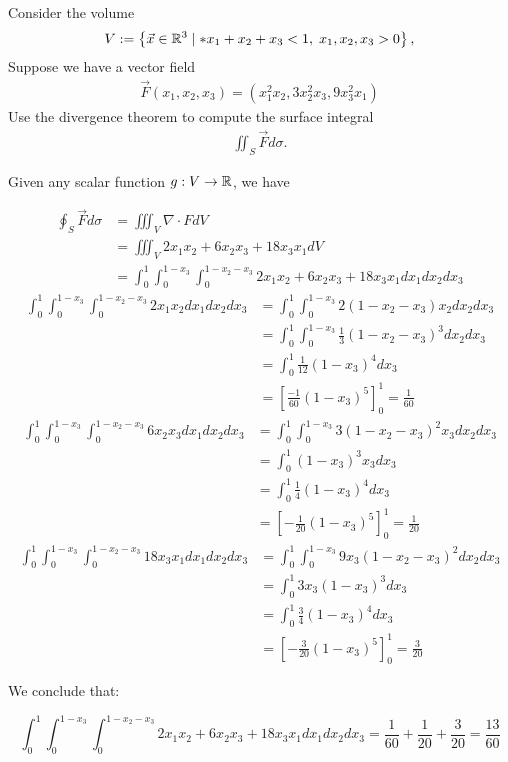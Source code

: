 \documentclass[11pt]{article}
\begin{document}
\begin{exercise} %
    Consider the volume 
    \begin{align}
     V := \left\{ \vec x \in \bbR^3 \suchthat* x_1 + x_2 + x_3 < 1, \; x_1, x_2, x_3 > 0 \right\},
    \end{align}
    Suppose we have a vector field 
    \begin{align}
        \vec F(x_1,x_2,x_3) = \left( x_1^2 x_2, 3 x_2^{2} x_3, 9 x_3^{2} x_1 \right)
    \end{align}
    Use the divergence theorem to compute the surface integral 
    \begin{align}
        \iint_{S} \vec F d\sigma.
    \end{align}
\end{exercise}
\begin{solution}     
    Given any scalar function $g : V \to \mathbb{R}$, we have 

    \begin{align*}
        \oint_{S} \vec F d\sigma & = \iiint_V \nabla \cdot F dV\\
		&= \iiint_V 2x_1x_2 + 6x_2x_3 + 18x_3x_1 dV\\
		&= \int_{0}^{1}\int_{0}^{1 - x_3}\int_{0}^{1 - x_2 - x_3} 2x_1x_2 + 6x_2x_3 + 18x_3x_1 dx_1 dx_2 dx_3
    \end{align*}
    \begin{align*}
        \int_{0}^{1}\int_{0}^{1 - x_3}\int_{0}^{1 - x_2 - x_3} 2x_1x_2 dx_1 dx_2 dx_3 &= \int_{0}^{1}\int_{0}^{1 - x_3} 2(1-x_2-x_3)x_2 dx_2 dx_3\\
	&= \int_{0}^{1}\int_{0}^{1 - x_3} \frac{1}{3}(1-x_2-x_3)^3 dx_2 dx_3\\
	&= \int_{0}^{1} \frac{1}{12}(1-x_3)^4 dx_3\\
	&= \left[ \frac{-1}{60}(1-x_3)^5\right]_0^1 = \frac{1}{60}
    \end{align*}
    \begin{align*}
        \int_{0}^{1}\int_{0}^{1 - x_3}\int_{0}^{1 - x_2 - x_3} 6x_2x_3  dx_1 dx_2 dx_3 &= \int_{0}^{1}\int_{0}^{1 - x_3} 3(1 - x_2 - x_3)^2 x_3   dx_2 dx_3 \\
	&= \int_{0}^{1} (1 - x_3)^3 x_3   dx_3 \\
	&= \int_{0}^{1} \frac{1}{4}(1 - x_3)^4  dx_3 \\
	&= \left[-\frac{1}{20}(1 - x_3)^5 \right]_0^1 = \frac{1}{20}
    \end{align*}
	\begin{align*}
         \int_{0}^{1}\int_{0}^{1 - x_3}\int_{0}^{1 - x_2 - x_3} 18x_3x_1 dx_1 dx_2 dx_3&= \int_{0}^{1}\int_{0}^{1 - x_3} 9x_3(1-x_2-x_3)^2   dx_2 dx_3 \\
	&=\int_{0}^{1} 3x_3(1-x_3)^3  dx_3 \\
	&= \int_{0}^{1} \frac{3}{4}(1-x_3)^4  dx_3 \\
	&= \left[-\frac{3}{20}(1-x_3)^5  \right]_0^1 =\frac{3}{20}
    \end{align*}

We conclude that:

$$
\int_{0}^{1}\int_{0}^{1 - x_3}\int_{0}^{1 - x_2 - x_3} 2x_1x_2 + 6x_2x_3 + 18x_3x_1 dx_1 dx_2 dx_3 = \frac{1}{60} + \frac{1}{20} + \frac{3}{20} = \frac{13}{60}
$$
\end{solution}
\end{document}

